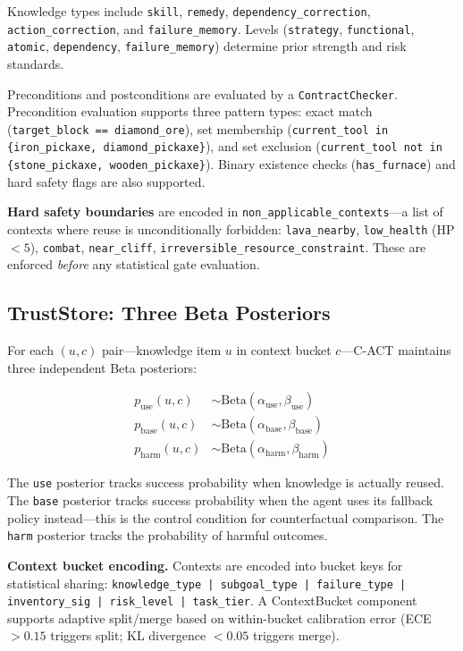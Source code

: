 \documentclass[letterpaper]{article}
\begin{document}
Knowledge types include \texttt{skill}, \texttt{remedy}, \texttt{dependency\_correction}, \texttt{action\_correction}, and \texttt{failure\_memory}. Levels (\texttt{strategy}, \texttt{functional}, \texttt{atomic}, \texttt{dependency}, \texttt{failure\_memory}) determine prior strength and risk standards.

Preconditions and postconditions are evaluated by a \texttt{ContractChecker}. Precondition evaluation supports three pattern types: exact match (\texttt{target\_block == diamond\_ore}), set membership (\texttt{current\_tool in \{iron\_pickaxe, diamond\_pickaxe\}}), and set exclusion (\texttt{current\_tool not in \{stone\_pickaxe, wooden\_pickaxe\}}). Binary existence checks (\texttt{has\_furnace}) and hard safety flags are also supported.

\textbf{Hard safety boundaries} are encoded in \texttt{non\_applicable\_contexts}---a list of contexts where reuse is unconditionally forbidden: \texttt{lava\_nearby}, \texttt{low\_health} (HP $< 5$), \texttt{combat}, \texttt{near\_cliff}, \texttt{irreversible\_resource\_constraint}. These are enforced \emph{before} any statistical gate evaluation.

\subsection{TrustStore: Three Beta Posteriors}

For each $(u, c)$ pair---knowledge item $u$ in context bucket $c$---\textsc{C-ACT} maintains three independent Beta posteriors:

\begin{align}
p_{\text{use}}(u, c) &\sim \text{Beta}(\alpha_{\text{use}}, \beta_{\text{use}}) \\
p_{\text{base}}(u, c) &\sim \text{Beta}(\alpha_{\text{base}}, \beta_{\text{base}}) \\
p_{\text{harm}}(u, c) &\sim \text{Beta}(\alpha_{\text{harm}}, \beta_{\text{harm}})
\end{align}

The \texttt{use} posterior tracks success probability when knowledge is actually reused. The \texttt{base} posterior tracks success probability when the agent uses its fallback policy instead---this is the control condition for counterfactual comparison. The \texttt{harm} posterior tracks the probability of harmful outcomes.

\textbf{Context bucket encoding.} Contexts are encoded into bucket keys for statistical sharing: \texttt{knowledge\_type | subgoal\_type | failure\_type | inventory\_sig | risk\_level | task\_tier}. A ContextBucket component supports adaptive split/merge based on within-bucket calibration error (ECE $> 0.15$ triggers split; KL divergence $< 0.05$ triggers merge).
\end{document}
